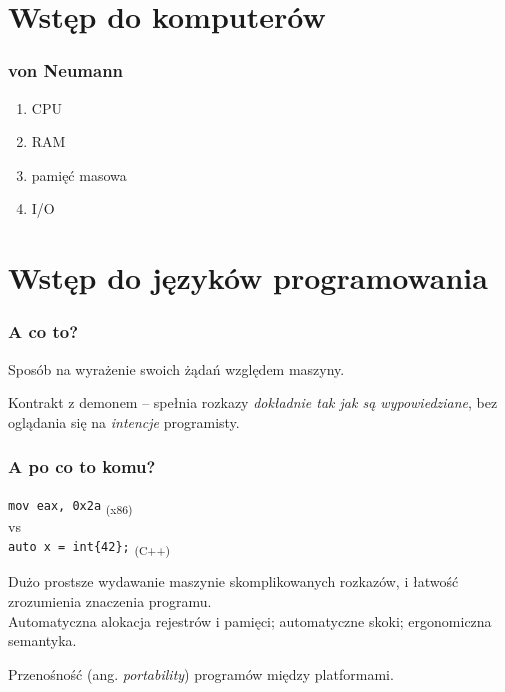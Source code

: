 \documentclass[aspectratio=169]{beamer}
\begin{document}
\section{Wstęp do komputerów}

\begin{frame}
    \frametitle{von Neumann}

    \begin{enumerate}
        \item CPU
        \item RAM
        \item pamięć masowa
        \item I/O
    \end{enumerate}
\end{frame}

\section{Wstęp do języków programowania}

\begin{frame}
    \frametitle{A co to?}

    Sposób na wyrażenie swoich żądań względem maszyny.

    \vspace{1em}

    Kontrakt z demonem -- spełnia rozkazy \emph{dokładnie tak jak są
    wypowiedziane}, bez oglądania się na \emph{intencje} programisty.
\end{frame}

\begin{frame}
    \frametitle{A po co to komu?}
    {\tt mov eax, 0x2a} \textsubscript{(x86)}\\
    vs\\
    {\tt auto x = int\{42\};} \textsubscript{(C++)}

    \vspace{2em}

    Dużo prostsze wydawanie maszynie skomplikowanych rozkazów, i łatwość
    zrozumienia znaczenia programu.\\
    Automatyczna alokacja rejestrów i pamięci; automatyczne skoki; ergonomiczna
    semantyka.

    \vspace{1em}

    Przenośność (ang. \emph{portability}) programów między platformami.
\end{frame}
\end{document}

